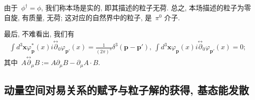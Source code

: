 
由于~$\phi^\dag=\phi$, 我们称本场是实的, 即其描述的粒子无荷. 总之, 本场描述的粒子为零自旋, 有质量, 无荷; 这对应的自然界中的粒子, 是~$\pi^0$ 介子.

最后, 不难看出, 我们有
\begin{align}\label{rela.}
\int d^3\bm{x}\varphi^*_{\bm{p}}(x)i\overset{\leftrightarrow}{\partial}_0\varphi_{\bm{p}'}(x)=\frac{1}{(2\pi)^3}\delta^3(\bm{p}-\bm{p}'),~\int d^3\bm{x}\varphi_{\bm{p}}(x)i\overset{\leftrightarrow}{\partial}_0\varphi_{\bm{p}'}(x)=0;
\end{align}
其中~$A\overset{\leftrightarrow}{\partial}_\mu B:=A\partial_\mu B-\partial_\mu A\cdot B$.


\subsection{动量空间对易关系的赋予与粒子解的获得, 基态能发散}


